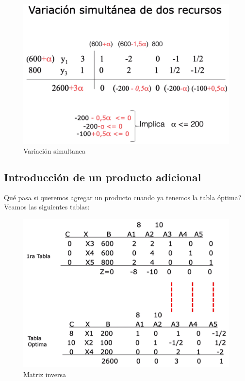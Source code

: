 \documentclass[titlepage,a4paper]{article}
\begin{document}
\begin{figure}[H]
    \centering
    \includegraphics[scale=0.36]{variacion_simultanea.png}
    \caption{Variación simultanea}
\end{figure}

\vspace{0.5cm}

\subsection{Introducción de un producto adicional}

Qué pasa si queremos agregar un producto cuando ya tenemos la tabla óptima? Veamos las siguientes tablas:

\begin{figure}[H]
    \centering
    \includegraphics[scale=0.36]{matriz_inversa.png}
    \caption{Matriz inversa}
\end{figure}
\end{document}
